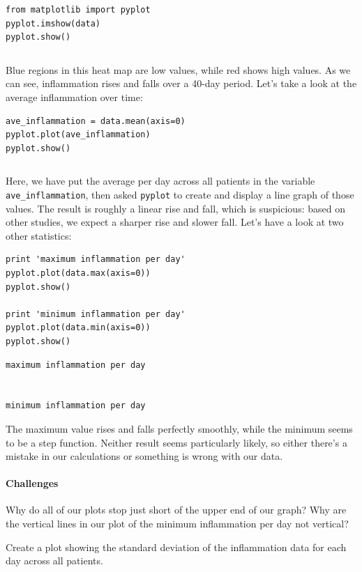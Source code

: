 \documentclass{book}
\begin{document}
\begin{verbatim}
from matplotlib import pyplot
pyplot.imshow(data)
pyplot.show()
\end{verbatim}

\begin{verbatim}
\end{verbatim}

Blue regions in this heat map are low values, while red shows high
values. As we can see, inflammation rises and falls over a 40-day
period. Let's take a look at the average inflammation over time:

\begin{verbatim}
ave_inflammation = data.mean(axis=0)
pyplot.plot(ave_inflammation)
pyplot.show()
\end{verbatim}

\begin{verbatim}
\end{verbatim}

Here, we have put the average per day across all patients in the
variable \texttt{ave\_inflammation}, then asked \texttt{pyplot} to
create and display a line graph of those values. The result is roughly a
linear rise and fall, which is suspicious: based on other studies, we
expect a sharper rise and slower fall. Let's have a look at two other
statistics:

\begin{verbatim}
print 'maximum inflammation per day'
pyplot.plot(data.max(axis=0))
pyplot.show()

print 'minimum inflammation per day'
pyplot.plot(data.min(axis=0))
pyplot.show()
\end{verbatim}

\begin{verbatim}
maximum inflammation per day


minimum inflammation per day

\end{verbatim}

The maximum value rises and falls perfectly smoothly, while the minimum
seems to be a step function. Neither result seems particularly likely,
so either there's a mistake in our calculations or something is wrong
with our data.

\mbox{}\paragraph{Challenges}

\begin{swcenumerate}
\item
  Why do all of our plots stop just short of the upper end of our graph?
  Why are the vertical lines in our plot of the minimum inflammation per
  day not vertical?
\item
  Create a plot showing the standard deviation of the inflammation data
  for each day across all patients.
\end{swcenumerate}
\end{document}

